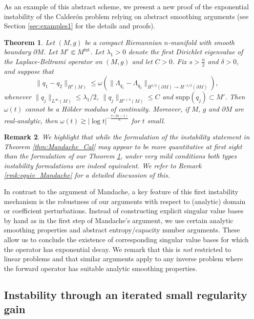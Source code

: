 \documentclass[12pt,twoside]{amsart}
\numberwithin{equation}{section}
\renewcommand{\leq}{\leqslant}
\newtheorem{theorem}{Theorem}[section]
\newtheorem{remark}[theorem]{Remark}
\newcommand {\p} {\partial}
\newcommand{\abs}[1]{\lvert #1 \rvert}          %
\newcommand{\norm}[1]{\lVert #1 \rVert}         %
\newcommand{\supp}{\mathrm{supp}}
\begin{document}
As an example of this abstract scheme, we present a new proof of the exponential instability of the Calder\'on problem relying on abstract smoothing arguments (see Section \ref{sec:examples1} for the details and proofs).

\begin{theorem}
\label{thm:Cald1}
Let $(M,g)$ be a compact Riemannian $n$-manifold with smooth boundary $\partial M$. Let $M' \Subset M^{\mathrm{int}}$.
Let $\lambda_1>0$ denote the first Dirichlet eigenvalue of the Laplace-Beltrami operator on $(M,g)$ and let $C>0$.
Fix $s > \frac{n}{2}$ and $\delta > 0$, and suppose that 
\[
\norm{q_1-q_2}_{H^s(M)} \leq \omega(\norm{\Lambda_{q_1}-\Lambda_{q_2}}_{H^{1/2}(\p M) \to H^{-1/2}(\p M)}),
\]
whenever $\norm{q_j}_{L^{\infty}(M)} \leq \lambda_1/2$, $\norm{q_j}_{H^{s+\delta}(M)} \leq C$ and $\supp(q_j) \subset M'$. Then $\omega(t)$ cannot be a H\"older modulus of continuity. Moreover, if $M$, $g$ and $\p M$ are real-analytic, then $\omega(t) \gtrsim \abs{\log t}^{-\frac{\delta(2n-1)}{n}}$ for $t$ small.
\end{theorem}


\begin{remark}
We highlight that while the formulation of the instability statement in Theorem \ref{thm:Mandache_Cal} may appear to be more quantitative at first sight than the formulation of our Theorem \ref{thm:Cald1}, under very mild conditions both types instability formulations are indeed equivalent. We refer to Remark \ref{rmk:equiv_Mandache} for a detailed discussion of this.
\end{remark}




In contrast to the argument of Mandache, a key feature of this first instability mechanism is the robustness of our arguments with respect to (analytic) domain or coefficient perturbations. Instead of constructing explicit singular value bases by hand as in the first step of Mandache's argument, we use certain analytic smoothing properties and abstract entropy/capacity number arguments. These allow us to conclude the existence of corresponding singular value bases for which the operator has exponential decay.
We remark that this is \emph{not} restricted to linear problems and that similar arguments apply to any inverse problem where the forward operator has suitable analytic smoothing properties.





\subsection{Instability through an iterated small regularity gain} 
\label{sec:instII}
\end{document}
